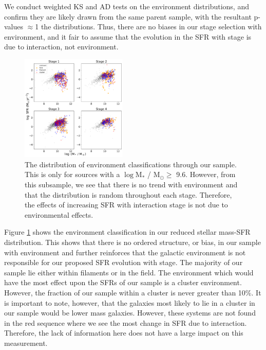 We conduct weighted KS and AD tests on the environment distributions, and confirm they are likely drawn from the same parent sample, with the resultant p-values $\approx$1 the distributions. Thus, there are no biases in our stage selection with environment, and it fair to assume that the evolution in the SFR with stage is due to interaction, not environment.

\begin{figure}
    \centering
    \includegraphics[width=0.45\textwidth]{Chapter3/figures/sfr-mass-density.pdf}
    \caption{The distribution of environment classifications through our sample. This is only for sources with a $\log$M$_*$ / M$_\odot \geq$ 9.6. However, from this subsample, we see that there is no trend with environment and that the distribution is random throughout each stage. Therefore, the effects of increasing SFR with interaction stage is not due to environmental effects.}
    \label{fig:dens-sfr-mass}
\end{figure}

Figure \ref{fig:dens-sfr-mass} shows the environment classification in our reduced stellar mass-SFR distribution. This shows that there is no ordered structure, or bias, in our sample with environment and further reinforces that the galactic environment is not responsible for our proposed SFR evolution with stage. The majority of our sample lie either within filaments or in the field. The environment which would have the most effect upon the SFRs of our sample is a cluster environment. However, the fraction of our sample within a cluster is never greater than 10\%. It is important to note, however, that the galaxies most likely to lie in a cluster in our sample would be lower mass galaxies. However, these systems are not found in the red sequence where we see the most change in SFR due to interaction. Therefore, the lack of information here does not have a large impact on this measurement. 

